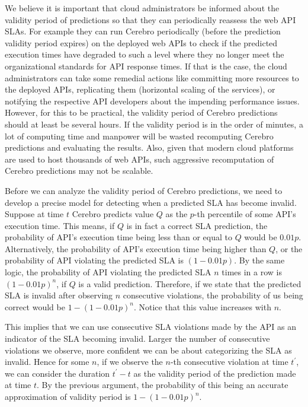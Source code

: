 We believe
it is important that cloud administrators be informed about the validity period of predictions so that they can periodically reassess the web
API SLAs. For example they can run Cerebro periodically (before the prediction validity period expires) on the deployed web APIs to check
if the predicted execution times have degraded to such a level where they no longer meet the organizational standards for API
response times. If that is the case, the cloud administrators can take some remedial actions like committing more resources to the deployed APIs,
replicating them (horizontal scaling of the services), or notifying the respective API developers about the impending performance issues. However,
for this to be practical, the validity period of Cerebro predictions should at least be several hours. If the validity period is in the order of minutes,
a lot of computing time and manpower will be wasted recomputing Cerebro predictions and evaluating the results. Also, given that
modern cloud platforms are used to host thousands of web APIs, such aggressive recomputation of Cerebro predictions may not be scalable.

Before we can analyze the validity period of Cerebro predictions, we need to develop a precise model for detecting when a predicted SLA
has become invalid. Suppose at time $t$ Cerebro predicts value $Q$ as the $p$-th percentile of some API's execution time.
This means, if $Q$ is in fact a correct SLA prediction, the probability of API's execution time being less than or equal to $Q$ would be $0.01p$. 
Alternatively, the probability
of API's execution time being higher than $Q$, or the probability of API violating the predicted SLA is $(1-0.01p)$. By the same logic, 
the probability of API violating the predicted SLA $n$ times in a row is $(1-0.01p)^n$, if $Q$ is a valid prediction. 
Therefore, if we state that the 
predicted SLA is invalid after observing $n$ consecutive violations, the probability of us being correct would be $1 - (1-0.01p)^n$. 
Notice that this value increases with $n$. 

This implies that we can use consecutive SLA violations made by the API as an indicator of the SLA becoming
invalid. Larger the number of consecutive violations we observe, more confident we can be about categorizing the SLA as invalid. 
Hence for some $n$, if we observe
the $n$-th consecutive violation at time $t^\prime$, we can consider the duration $t^\prime - t$ as the validity period of the prediction made 
at time $t$. By the previous argument, the probability of this being an accurate approximation of validity period is $1 - (1-0.01p)^n$.

